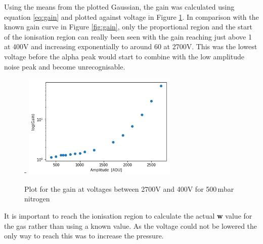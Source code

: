 \documentclass[a4paper]{article}
\begin{document}
\noindent Using the means from the plotted Gaussian, the gain was calculated using equation \ref{eq:gain} and plotted against voltage in Figure \ref{fig:gain1}. In comparison with the known gain curve in Figure \ref{fig:gain}, only the proportional region and the start of the ionisation region can really been seen with the gain reaching just above 1 at 400V and increasing exponentially to around 60 at 2700V. This was the lowest voltage before the alpha peak would start to combine with the low amplitude noise peak and become unrecognisable.
\begin{figure}[H]-
    \centering
    \includegraphics[height=5cm]{gain1.png}
    \caption{Plot for the gain at voltages between 2700V and 400V for 500\,mbar nitrogen}
    \label{fig:gain1}
\end{figure}
\noindent It is important to reach the ionisation region to calculate the actual \textbf{w} value for the gas rather than using a known value. As the voltage could not be lowered the only way to reach this was to increase the pressure.
\end{document}
